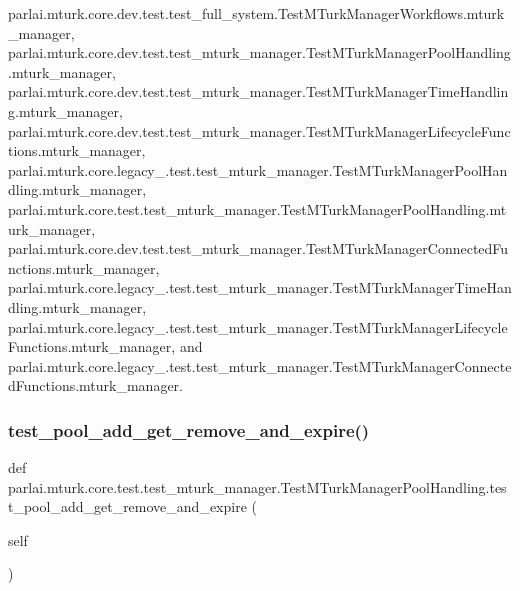 parlai.\+mturk.\+core.\+dev.\+test.\+test\+\_\+full\+\_\+system.\+Test\+M\+Turk\+Manager\+Workflows.\+mturk\+\_\+manager, parlai.\+mturk.\+core.\+dev.\+test.\+test\+\_\+mturk\+\_\+manager.\+Test\+M\+Turk\+Manager\+Pool\+Handling.\+mturk\+\_\+manager, parlai.\+mturk.\+core.\+dev.\+test.\+test\+\_\+mturk\+\_\+manager.\+Test\+M\+Turk\+Manager\+Time\+Handling.\+mturk\+\_\+manager, parlai.\+mturk.\+core.\+dev.\+test.\+test\+\_\+mturk\+\_\+manager.\+Test\+M\+Turk\+Manager\+Lifecycle\+Functions.\+mturk\+\_\+manager, parlai.\+mturk.\+core.\+legacy\+\_.\+test.\+test\+\_\+mturk\+\_\+manager.\+Test\+M\+Turk\+Manager\+Pool\+Handling.\+mturk\+\_\+manager, parlai.\+mturk.\+core.\+test.\+test\+\_\+mturk\+\_\+manager.\+Test\+M\+Turk\+Manager\+Pool\+Handling.\+mturk\+\_\+manager, parlai.\+mturk.\+core.\+dev.\+test.\+test\+\_\+mturk\+\_\+manager.\+Test\+M\+Turk\+Manager\+Connected\+Functions.\+mturk\+\_\+manager, parlai.\+mturk.\+core.\+legacy\+\_.\+test.\+test\+\_\+mturk\+\_\+manager.\+Test\+M\+Turk\+Manager\+Time\+Handling.\+mturk\+\_\+manager, parlai.\+mturk.\+core.\+legacy\+\_.\+test.\+test\+\_\+mturk\+\_\+manager.\+Test\+M\+Turk\+Manager\+Lifecycle\+Functions.\+mturk\+\_\+manager, and parlai.\+mturk.\+core.\+legacy\+\_.\+test.\+test\+\_\+mturk\+\_\+manager.\+Test\+M\+Turk\+Manager\+Connected\+Functions.\+mturk\+\_\+manager.

\mbox{\label{classparlai_1_1mturk_1_1core_1_1test_1_1test__mturk__manager_1_1TestMTurkManagerPoolHandling_a5695f4bee19708321eb50ef6373a3aa2}} 
\subsubsection{\texorpdfstring{test\+\_\+pool\+\_\+add\+\_\+get\+\_\+remove\+\_\+and\+\_\+expire()}{test\_pool\_add\_get\_remove\_and\_expire()}}
{\footnotesize\ttfamily def parlai.\+mturk.\+core.\+test.\+test\+\_\+mturk\+\_\+manager.\+Test\+M\+Turk\+Manager\+Pool\+Handling.\+test\+\_\+pool\+\_\+add\+\_\+get\+\_\+remove\+\_\+and\+\_\+expire (\begin{DoxyParamCaption}\item[{}]{self }\end{DoxyParamCaption})}

